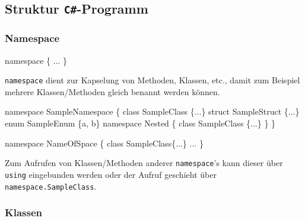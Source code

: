 \documentclass[
  9pt,
  a4paperpaper,
  DIV=11]{scrartcl}
\newenvironment{Shaded}{}{}
\newcommand{\KeywordTok}[1]{\textcolor[rgb]{0.84,0.23,0.29}{#1}}
\newcommand{\NormalTok}[1]{\textcolor[rgb]{0.14,0.16,0.18}{#1}}
\newcommand{\OperatorTok}[1]{\textcolor[rgb]{0.14,0.16,0.18}{#1}}
\numberwithin{equation}{section}
\begin{document}
\begin{multicols}{2}

\hypertarget{struktur-c-programm}{%
\subsection{\texorpdfstring{Struktur
\texttt{C\#}-Programm}{Struktur C\#-Programm}}\label{struktur-c-programm}}

\hypertarget{namespace}{%
\subsubsection{Namespace}\label{namespace}}

\begin{Shaded}
\begin{Highlighting}[]
\KeywordTok{namespace} \OperatorTok{\{} \OperatorTok{...} \OperatorTok{\}}
\end{Highlighting}
\end{Shaded}

\texttt{namespace} dient zur Kapselung von Methoden, Klassen, etc.,
damit zum Beispiel mehrere Klassen/Methoden gleich benannt werden
können.

\begin{Shaded}
\begin{Highlighting}[]
\KeywordTok{namespace}\NormalTok{ SampleNamespace }\OperatorTok{\{}
  \KeywordTok{class}\NormalTok{ SampleClass }\OperatorTok{\{...\}}
  \KeywordTok{struct}\NormalTok{ SampleStruct }\OperatorTok{\{...\}}
  \KeywordTok{enum}\NormalTok{ SampleEnum }\OperatorTok{\{}\NormalTok{a}\OperatorTok{,}\NormalTok{ b}\OperatorTok{\}}
  \KeywordTok{namespace}\NormalTok{ Nested }\OperatorTok{\{}
    \KeywordTok{class}\NormalTok{ SampleClass }\OperatorTok{\{...\}}
  \OperatorTok{\}}
\OperatorTok{\}}

\KeywordTok{namespace}\NormalTok{ NameOfSpace }\OperatorTok{\{}
  \KeywordTok{class}\NormalTok{ SampleClass}\OperatorTok{\{...\}}
  \OperatorTok{...}
\OperatorTok{\}}
\end{Highlighting}
\end{Shaded}

Zum Aufrufen von Klassen/Methoden anderer \texttt{namespace}'s kann
dieser über \texttt{using} eingebunden werden oder der Aufruf geschieht
über \texttt{namespace.SampleClass}.

\hypertarget{klassen}{%
\subsubsection{Klassen}\label{klassen}}


\end{multicols}
\end{document}
